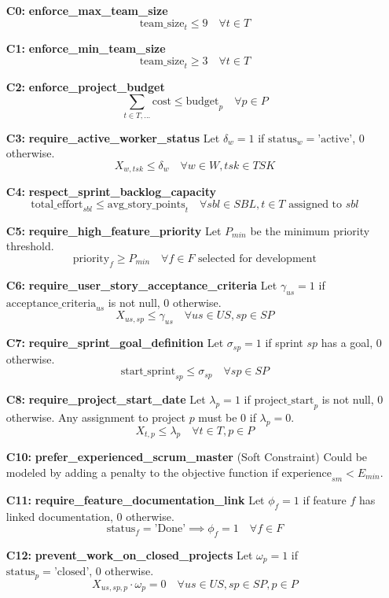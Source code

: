 \documentclass[11pt, a4paper]{article}
\begin{document}
\begin{itemize}
    \item[\textbf{C0:}] \textbf{enforce\_max\_team\_size}
    $$ \text{team\_size}_t \le 9 \quad \forall t \in T $$
    \item[\textbf{C1:}] \textbf{enforce\_min\_team\_size}
    $$ \text{team\_size}_t \ge 3 \quad \forall t \in T $$
    \item[\textbf{C2:}] \textbf{enforce\_project\_budget}
    $$ \sum_{t \in T, ...} \text{cost} \le \text{budget}_p \quad \forall p \in P $$
    \item[\textbf{C3:}] \textbf{require\_active\_worker\_status}
    Let $\delta_w = 1$ if $\text{status}_w = \text{'active'}$, 0 otherwise.
    $$ X_{w,tsk} \le \delta_w \quad \forall w \in W, tsk \in TSK $$
    \item[\textbf{C4:}] \textbf{respect\_sprint\_backlog\_capacity}
    $$ \text{total\_effort}_{sbl} \le \text{avg\_story\_points}_{t} \quad \forall sbl \in SBL, t \in T \text{ assigned to } sbl $$
    \item[\textbf{C5:}] \textbf{require\_high\_feature\_priority}
    Let $P_{min}$ be the minimum priority threshold.
    $$ \text{priority}_f \ge P_{min} \quad \forall f \in F \text{ selected for development} $$
    \item[\textbf{C6:}] \textbf{require\_user\_story\_acceptance\_criteria}
    Let $\gamma_{us} = 1$ if $\text{acceptance\_criteria}_{us}$ is not null, 0 otherwise.
    $$ X_{us,sp} \le \gamma_{us} \quad \forall us \in US, sp \in SP $$
    \item[\textbf{C7:}] \textbf{require\_sprint\_goal\_definition}
    Let $\sigma_{sp} = 1$ if sprint $sp$ has a goal, 0 otherwise.
    $$ \text{start\_sprint}_{sp} \le \sigma_{sp} \quad \forall sp \in SP $$
    \item[\textbf{C8:}] \textbf{require\_project\_start\_date}
    Let $\lambda_p = 1$ if $\text{project\_start}_p$ is not null, 0 otherwise. Any assignment to project $p$ must be 0 if $\lambda_p = 0$.
    $$ X_{t,p} \le \lambda_p \quad \forall t \in T, p \in P $$
    \item[\textbf{C10:}] \textbf{prefer\_experienced\_scrum\_master} (Soft Constraint)
    Could be modeled by adding a penalty to the objective function if $\text{experience}_{sm} < E_{min}$.
    \item[\textbf{C11:}] \textbf{require\_feature\_documentation\_link}
    Let $\phi_f = 1$ if feature $f$ has linked documentation, 0 otherwise.
    $$ \text{status}_f = \text{'Done'} \implies \phi_f = 1 \quad \forall f \in F $$
    \item[\textbf{C12:}] \textbf{prevent\_work\_on\_closed\_projects}
    Let $\omega_p = 1$ if $\text{status}_p = \text{'closed'}$, 0 otherwise.
    $$ X_{us,sp,p} \cdot \omega_p = 0 \quad \forall us \in US, sp \in SP, p \in P $$
\end{itemize}
\end{document}
